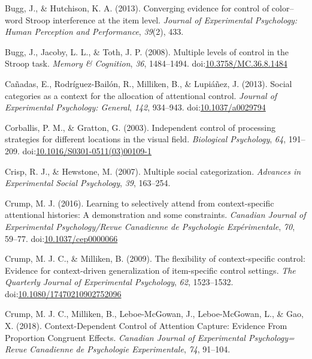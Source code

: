\documentclass[english,,man,floatsintext]{apa6}
\begin{document}
\hypertarget{ref-bugg_converging_2013}{}
Bugg, J., \& Hutchison, K. A. (2013). Converging evidence for control of
color--word Stroop interference at the item level. \emph{Journal of
Experimental Psychology: Human Perception and Performance},
\emph{39}(2), 433.

\hypertarget{ref-bugg_multiple_2008}{}
Bugg, J., Jacoby, L. L., \& Toth, J. P. (2008). Multiple levels of
control in the Stroop task. \emph{Memory \& Cognition}, \emph{36},
1484--1494.
doi:\href{https://doi.org/10.3758/MC.36.8.1484}{10.3758/MC.36.8.1484}

\hypertarget{ref-canadas_social_2013}{}
Cañadas, E., Rodríguez-Bailón, R., Milliken, B., \& Lupiáñez, J. (2013).
Social categories as a context for the allocation of attentional
control. \emph{Journal of Experimental Psychology: General}, \emph{142},
934--943. doi:\href{https://doi.org/10.1037/a0029794}{10.1037/a0029794}

\hypertarget{ref-corballis_independent_2003}{}
Corballis, P. M., \& Gratton, G. (2003). Independent control of
processing strategies for different locations in the visual field.
\emph{Biological Psychology}, \emph{64}, 191--209.
doi:\href{https://doi.org/10.1016/S0301-0511(03)00109-1}{10.1016/S0301-0511(03)00109-1}

\hypertarget{ref-crisp_multiple_2007}{}
Crisp, R. J., \& Hewstone, M. (2007). Multiple social categorization.
\emph{Advances in Experimental Social Psychology}, \emph{39}, 163--254.

\hypertarget{ref-crump_learning_2016}{}
Crump, M. J. (2016). Learning to selectively attend from
context-specific attentional histories: A demonstration and some
constraints. \emph{Canadian Journal of Experimental Psychology/Revue
Canadienne de Psychologie Expérimentale}, \emph{70}, 59--77.
doi:\href{https://doi.org/10.1037/cep0000066}{10.1037/cep0000066}

\hypertarget{ref-crump_flexibility_2009}{}
Crump, M. J. C., \& Milliken, B. (2009). The flexibility of
context-specific control: Evidence for context-driven generalization of
item-specific control settings. \emph{The Quarterly Journal of
Experimental Psychology}, \emph{62}, 1523--1532.
doi:\href{https://doi.org/10.1080/17470210902752096}{10.1080/17470210902752096}

\hypertarget{ref-crump_context-dependent_2018}{}
Crump, M. J. C., Milliken, B., Leboe-McGowan, J., Leboe-McGowan, L., \&
Gao, X. (2018). Context-Dependent Control of Attention Capture: Evidence
From Proportion Congruent Effects. \emph{Canadian Journal of
Experimental Psychology= Revue Canadienne de Psychologie Experimentale},
\emph{74}, 91--104.
\end{document}
